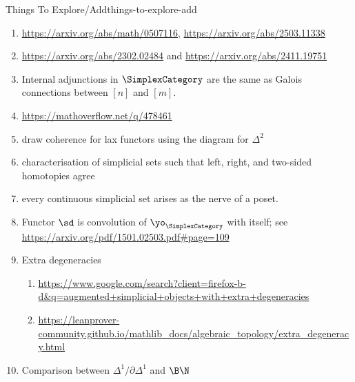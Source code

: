 \begin{remark}{Things To Explore/Add}{things-to-explore-add}
\begin{enumerate}
\begin{enumerate}
                \item In an $\infty$-category, define a \textbf{quasi-unit} to be a 1-morphism $f$ such that
                    \begin{align*}
                        [f]_{*} &\colon \Hom_{\Ho(\Spaces)}(\Hom_{\mathcal{C}}(X,A)\Hom_{\mathcal{C}}(X,B)),\\
                        [f]^{*} &\colon \Hom_{\Ho(\Spaces)}(\Hom_{\mathcal{C}}(B,X)\Hom_{\mathcal{C}}(A,X))
                    \end{align*}
                    are the identity in $\Ho(\Spaces)$. Explore equivalent conditions,
                \item \url{https://arxiv.org/abs/1606.05669}
                \item \url{https://arxiv.org/abs/1702.08696}
            \end{enumerate}
        \item \url{https://arxiv.org/abs/math/0507116}, \url{https://arxiv.org/abs/2503.11338}
        \item \url{https://arxiv.org/abs/2302.02484} and \url{https://arxiv.org/abs/2411.19751}
        \item Internal adjunctions in $\SimplexCategory$ are the same as Galois connections between $[n]$ and $[m]$.
        \item \url{https://mathoverflow.net/q/478461}
        \item draw coherence for lax functors using the diagram for $\Delta^{2}$
        \item characterisation of simplicial sets such that left, right, and two-sided homotopies agree
        \item every continuous simplicial set arises as the nerve of a poset.
        \item Functor $\sd$ is convolution of $\yo_{\SimplexCategory}$ with itself; see \url{https://arxiv.org/pdf/1501.02503.pdf#page=109}
        \item Extra degeneracies
            \begin{enumerate}
                \item \url{https://www.google.com/search?client=firefox-b-d&q=augmented+simplicial+objects+with+extra+degeneracies}
                \item \url{https://leanprover-community.github.io/mathlib_docs/algebraic_topology/extra_degeneracy.html}
            \end{enumerate}
        \item Comparison between $\Delta^{1}/\partial\Delta^{1}$ and $\B\N$

\end{enumerate}
\end{remark}
